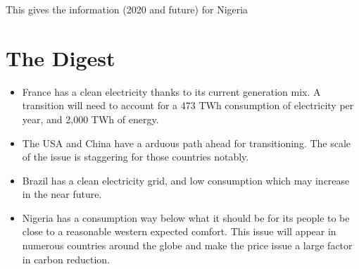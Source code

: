 This gives the information (2020 and future) for Nigeria


\section{The Digest}


\begin{kaoboxgreen}[frametitle=Main Takeaways]

\begin{itemize}
\item France has a clean electricity thanks to its current generation mix. A transition will need to account for a 473 TWh consumption of electricity per year, and 2,000 TWh of energy.
\item The USA and China have a arduous path ahead for transitioning. The scale of the issue is staggering for those countries notably.
\item Brazil has a clean electricity grid, and low consumption which may increase in the near future.
\item Nigeria has a consumption way below what it should be for its people to be close to a reasonable western expected comfort. This issue will appear in numerous countries around the globe and make the price issue a large factor in carbon reduction.
\end{itemize}
  
\end{kaoboxgreen}